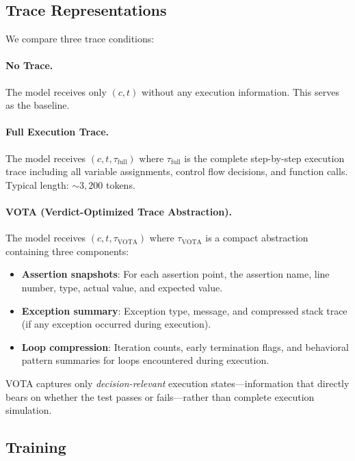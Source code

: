 \documentclass[11pt,a4paper]{article}
\begin{document}
\subsection{Trace Representations}

We compare three trace conditions:

\paragraph{No Trace.} The model receives only $(c, t)$ without any execution information. This serves as the baseline.

\paragraph{Full Execution Trace.} The model receives $(c, t, \tau_{\text{full}})$ where $\tau_{\text{full}}$ is the complete step-by-step execution trace including all variable assignments, control flow decisions, and function calls. Typical length: ${\sim}3{,}200$ tokens.

\paragraph{VOTA (Verdict-Optimized Trace Abstraction).} The model receives $(c, t, \tau_{\text{VOTA}})$ where $\tau_{\text{VOTA}}$ is a compact abstraction containing three components:

\begin{itemize}
\item \textbf{Assertion snapshots}: For each assertion point, the assertion name, line number, type, actual value, and expected value.
\item \textbf{Exception summary}: Exception type, message, and compressed stack trace (if any exception occurred during execution).
\item \textbf{Loop compression}: Iteration counts, early termination flags, and behavioral pattern summaries for loops encountered during execution.
\end{itemize}

VOTA captures only \emph{decision-relevant} execution states---information that directly bears on whether the test passes or fails---rather than complete execution simulation.

\subsection{Training}
\end{document}
